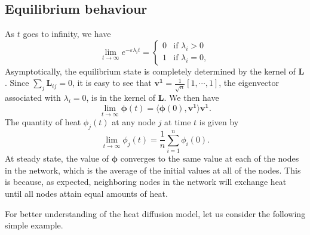\documentclass[10pt,a4paper]{article}
\begin{document}
    	 \subsection{ Equilibrium behaviour }
    	 As $t$ goes to infinity, we have 
    	 \begin{equation}
    	 \lim_{t \to \infty} e^{-\varepsilon\lambda_i t} = \begin{cases} 0 &\mbox{if } \lambda_i > 0 \\
    	 1 & \mbox{if } \lambda_i = 0, \end{cases} 
    	 \end{equation}
    	 Asymptotically, the equilibrium state is completely determined by the kernel of $\mathbf{L}$. Since $\sum_{j} \mathbf{L}_{ij}=0$, it is easy to see that $\mathbf{v^1}= \frac{1}{\sqrt{n}}[1,\cdots,1]$, the eigenvector associated with $\lambda_i =0$, is in the kernel of $\mathbf{L}$. We then have
    	 \begin{equation}
    	 \lim_{t \to \infty}\boldsymbol{\phi}(t) = \langle \boldsymbol{\phi}(0), \mathbf{v^1} \rangle \mathbf{v^1}.
    	 \end{equation}
    	 The quantity of heat $\phi_j(t)$ at any node $j$ at time $t$ is given by
    	 \begin{equation}
    	 \lim_{t \to \infty}\phi_j(t) = \frac{1}{n} \sum_{i = 1}^n \phi_i(0). 
    	 \end{equation}
    	 At steady state, the value of $\boldsymbol{\phi}$ converges to the same value at each of the nodes in the network, which is the average of the initial values at all of the nodes. This is because, as expected, neighboring nodes in the network will exchange heat until all nodes attain equal amounts of heat.
    	 
    	 For better understanding of the heat diffusion model, let us consider the following simple example.
    	 
\end{document}
